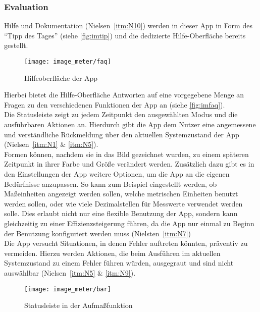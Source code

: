 \subsubsection{Evaluation}\label{subsec:imeva}
Hilfe und Dokumentation (Nielsen~\autoref{itm:N10}) werden in dieser App in Form des ``Tipp des Tages'' (siehe \autoref{fig:imtip}) und die dedizierte Hilfe-Oberfläche bereits gestellt.

\begin{wrapfigure}{R}{0.5\textwidth}
  \centering
  \texttt{[image: image\_meter/faq]}
  \caption{Hilfeoberfläche der App}
  \label{fig:imfaq}
\end{wrapfigure}

Hierbei bietet die Hilfe-Oberfläche Antworten auf eine vorgegebene Menge an Fragen zu den verschiedenen Funktionen der App an (siehe \autoref{fig:imfaq}). \\

Die Statusleiste zeigt zu jedem Zeitpunkt den ausgewählten Modus und die ausführbaren Aktionen an.
Hierdurch gibt die App dem Nutzer eine angemessene und verständliche Rückmeldung über den aktuellen Systemzustand der App (Nielsen~\autoref{itm:N1} \& \autoref{itm:N5}). \\

Formen können, nachdem sie in das Bild gezeichnet wurden, zu einem späteren Zeitpunkt in ihrer Farbe und Größe verändert werden.
Zusätzlich dazu gibt es in den Einstellungen der App weitere Optionen, um die App an die eigenen Bedürfnisse anzupassen.
So kann zum Beispiel eingestellt werden, ob Maßeinheiten angezeigt werden sollen, welche metrischen Einheiten benutzt werden sollen, oder wie viele Dezimalstellen für Messwerte verwendet werden solle.
Dies erlaubt nicht nur eine flexible Benutzung der App, sondern kann gleichzeitig zu einer Effizienzsteigerung führen, da die App nur einmal zu Beginn der Benutzung konfiguriert werden muss (Nielsten~\autoref{itm:N7}) \\

Die App versucht Situationen, in denen Fehler auftreten könnten, präventiv zu vermeiden.
Hierzu werden Aktionen, die beim Ausführen im aktuellen Systemzustand zu einem Fehler führen würden, ausgegraut und sind nicht auswählbar (Nielsen~\autoref{itm:N5} \& \autoref{itm:N9}).

\begin{wrapfigure}{R}{0.5\textwidth}
  \centering
  \texttt{[image: image\_meter/bar]}
  \caption{Statusleiste in der Aufmaßfunktion}
  \label{fig:imbar}
\end{wrapfigure}

